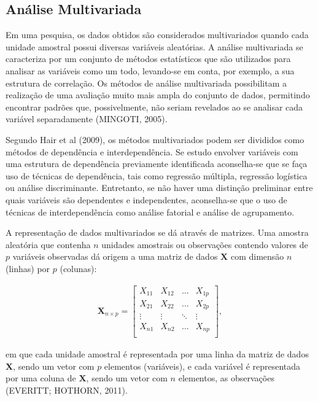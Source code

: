 \documentclass[12pt, a4paper,brazil,oneside]{article}
\begin{document}
	\subsection{Análise Multivariada}
	

	
	Em uma pesquisa, os dados obtidos são considerados multivariados quando cada unidade amostral possui diversas variáveis aleatórias. A análise multivariada se caracteriza por um conjunto de métodos estatísticos que são utilizados para analisar as variáveis como um todo, levando-se em conta, por exemplo, a sua estrutura de correlação. Os métodos de análise multivariada possibilitam a realização de  uma avaliação muito mais ampla do conjunto de dados, permitindo encontrar padrões que, possivelmente, não seriam revelados ao se analisar cada variável separadamente (MINGOTI, 2005). 
	
	Segundo Hair et al (2009), os métodos multivariados podem ser divididos como métodos de dependência e interdependência. Se estudo envolver variáveis com uma estrutura de dependência previamente identificada aconselha-se que se faça uso de técnicas de dependência, tais como regressão múltipla, regressão logística ou análise discriminante. 
	Entretanto, se não haver uma distinção preliminar entre quais variáveis são dependentes e independentes, aconselha-se que o uso de técnicas de interdependência como análise fatorial e análise de agrupamento.
	
	
	A representação de dados multivariados se dá através de matrizes. Uma amostra aleatória que contenha $n$ unidades amostrais ou observações contendo valores de $p$ variáveis observadas dá origem a uma matriz de dados $\boldsymbol{X}$ com dimensão $n$ (linhas) por $p$ (colunas):
	
	\begin{align}\label{X}
	\boldsymbol{X}_{n \times p} =
	\left[
	\begin{array}{cccc}
	X_{11} & X_{12} & \dots & X_{1p} \\
	X_{21} & X_{22} & \dots & X_{2p} \\
	\vdots & \vdots & \ddots & \vdots \\
	X_{n1} & X_{n2} & \dots & X_{np}\\
	\end{array}
	\right],
	\end{align}
	
	\noindent em que cada unidade amostral é representada por uma linha da matriz de dados $\boldsymbol{X}$, sendo um vetor com $p$ elementos (variáveis), e cada variável é representada por uma coluna de $\boldsymbol{X}$, sendo um vetor com $n$ elementos, as observações (EVERITT; HOTHORN, 2011).
	
\end{document}
